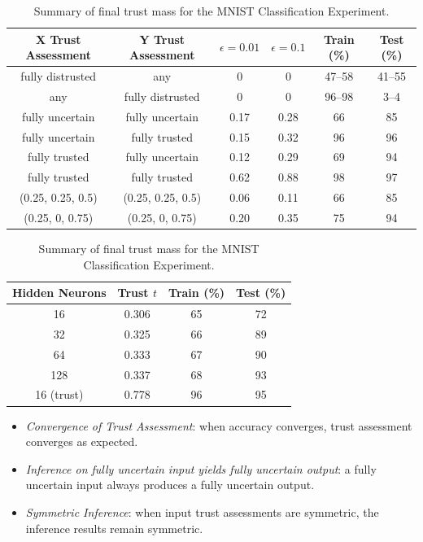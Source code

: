 \begin{table}[ht]
\begin{minipage}{0.63\textwidth}
\centering
\begin{tabular}{cccccc}
\hline
X Trust Assessment & Y Trust Assessment& \(\epsilon = 0.01\) & \(\epsilon = 0.1\) & Train (\%) & Test (\%) \\
\hline
fully distrusted & any & 0 & 0 & 47--58 & 41--55 \\
any & fully distrusted & 0 & 0 & 96--98 & 3--4 \\
fully uncertain & fully uncertain & 0.17 & 0.28 & 66 & 85 \\ %
fully uncertain & fully trusted & 0.15 & 0.32 & 96 & 96 \\ %
 fully trusted & fully uncertain & 0.12 & 0.29 & 69 & 94 \\ %
fully trusted & fully trusted & 0.62 & 0.88 & 98 & 97 \\ %
(0.25, 0.25, 0.5) & (0.25, 0.25, 0.5)& 0.06 & 0.11 & 66 & 85 \\
(0.25, 0, 0.75) & (0.25, 0, 0.75)& 0.20 & 0.35 & 75 & 94\\

\hline
\end{tabular}
\caption{Final trust mass and train/test accuracy (\%) for the Breast Cancer experiment. Rows where either assessment is fully distrusted collapse to zero trust and are grouped.}
\label{tab:cancer_results}
\end{minipage}
\hfill
\begin{minipage}{0.37\textwidth}
\centering
\begin{tabular}{cccc}
\hline
Hidden Neurons & Trust \(t\) & Train (\%) & Test (\%) \\
\hline
16 & 0.306 & 65 & 72\\
32 & 0.325 & 66 & 89 \\
64 & 0.333 & 67 & 90\\
128 & 0.337 & 68 & 93\\
16 (trust) & 0.778 & 96 & 95\\
\hline
\end{tabular}
\caption{Summary of final trust mass for the MNIST Classification Experiment.}
\label{tab:mnist}
\end{minipage}

\end{table}

\begin{itemize}
\item \emph{Convergence of Trust Assessment}: when accuracy converges, trust assessment converges as expected.
\item \emph{Inference on fully uncertain input yields fully uncertain output}: a fully uncertain input always produces a fully uncertain output.
\item \emph{Symmetric Inference}: when input trust assessments are symmetric, the inference results remain symmetric.
\end{itemize}

